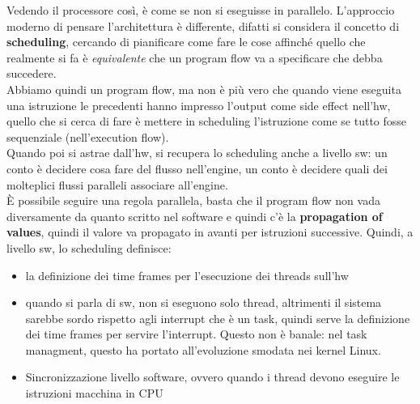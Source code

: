 \documentclass[14pt]{article}
\begin{document}
Vedendo il processore così, è come se non si eseguisse in parallelo. L'approccio moderno di pensare l'architettura è differente, difatti si considera il concetto di \textbf{scheduling}, cercando di pianificare come fare le cose affinché quello che realmente si fa è \textit{equivalente} che un program flow va a specificare che debba succedere.\\ Abbiamo quindi un program flow, ma non è più vero che quando viene eseguita una istruzione le precedenti hanno impresso l'output come side effect nell'hw, quello che si cerca di fare è mettere in scheduling l'istruzione come se tutto fosse sequenziale (nell'execution flow).\\ Quando poi si astrae dall'hw, si recupera lo scheduling anche a livello sw: un conto è decidere cosa fare del flusso nell'engine, un conto è decidere quali dei molteplici flussi paralleli associare all'engine.\\ È possibile seguire una regola parallela, basta che il program flow non vada diversamente da quanto scritto nel software e quindi c'è la \textbf{propagation of values}, quindi il valore va propagato in avanti per istruzioni successive. Quindi, a livello sw, lo scheduling definisce:
\begin{itemize}
\item la definizione dei time frames per l'esecuzione dei threads sull'hw
\item quando si parla di sw, non si eseguono solo thread, altrimenti il sistema sarebbe sordo rispetto agli interrupt che è un task, quindi serve la definizione dei time frames per servire l'interrupt. Questo non è banale: nel task managment, questo ha portato all'evoluzione smodata nei kernel Linux.
\item Sincronizzazione livello software, ovvero quando i thread devono eseguire le istruzioni macchina in CPU
\end{itemize}
\end{document}
